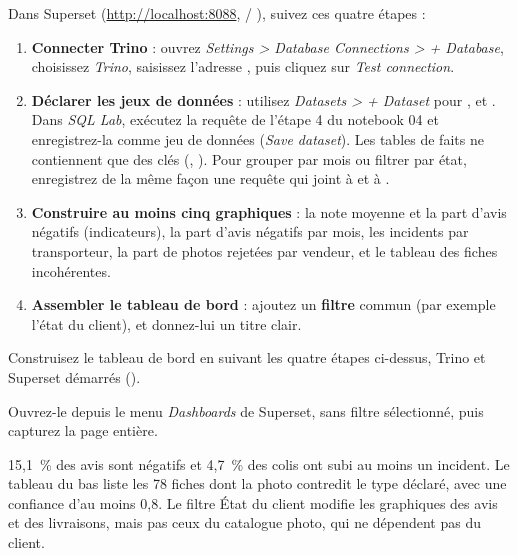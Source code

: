 Dans Superset (\url{http://localhost:8088},  / ), suivez ces quatre étapes :
\begin{enumerate}[leftmargin=*,itemsep=2pt]
  \item \textbf{Connecter Trino} : ouvrez \emph{Settings > Database Connections > + Database}, choisissez
        \emph{Trino}, saisissez l'adresse , puis cliquez sur
        \emph{Test connection}.
  \item \textbf{Déclarer les jeux de données} : utilisez \emph{Datasets > + Dataset} pour
        ,  et . Dans
        \emph{SQL Lab}, exécutez la requête de l'étape 4 du notebook 04 et enregistrez-la comme jeu
        de données (\emph{Save dataset}). Les tables de faits ne contiennent que des clés
        (, ). Pour grouper par mois ou filtrer par état,
        enregistrez de la même façon une requête qui joint  à  et à
        .
  \item \textbf{Construire au moins cinq graphiques} : la note moyenne et la part d'avis négatifs
        (indicateurs), la part d'avis négatifs par mois, les incidents par transporteur, la part de
        photos rejetées par vendeur, et le tableau des fiches incohérentes.
  \item \textbf{Assembler le tableau de bord} : ajoutez un \textbf{filtre} commun (par exemple l'état
        du client), et donnez-lui un titre clair.
\end{enumerate}

\begin{obtenir}
  \item Construisez le tableau de bord en suivant les quatre étapes ci-dessus, Trino et Superset démarrés ().
  \item Ouvrez-le depuis le menu \emph{Dashboards} de Superset, sans filtre sélectionné, puis capturez la page entière.
\end{obtenir}
\begin{lecture}
15,1~\% des avis sont négatifs et 4,7~\% des colis ont subi au moins un incident. Le tableau du bas
liste les 78 fiches dont la photo contredit le type déclaré, avec une confiance d'au moins 0,8. Le
filtre \og État du client \fg{} modifie les graphiques des avis et des livraisons, mais pas ceux du
catalogue photo, qui ne dépendent pas du client.
\end{lecture}


